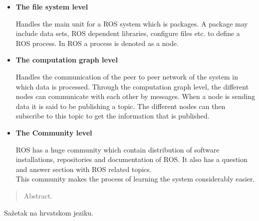 \documentclass[times, utf8, diplomski, english]{fer}
\begin{document}
\begin{itemize}
\item \textbf{The file system level}

Handles the main unit for a ROS system which is packages. A package may include data sets, ROS dependent libraries, configure files etc. to define a ROS process. In ROS a process is denoted as a node. 
\item \textbf{The computation graph level}

Handles the communication of the peer to peer network of the system in which data is processed. Through the computation graph level, the different nodes can communicate with each other by messages. When a node is sending data it is said to be publishing a topic. The different nodes can then subscribe to this topic to get the information that is published.
\item \textbf{The Community level}

ROS has a huge community which contain distribution of software installations, repositories and documentation of ROS. It also has a question and answer section with ROS related topics.\\
This community makes the process of learning the system considerably easier.
\end{itemize}
\begin{abstract}
Abstract.

\end{abstract}

\begin{sazetak}
Sažetak na hrvatskom jeziku.

\end{sazetak}
\end{document}
